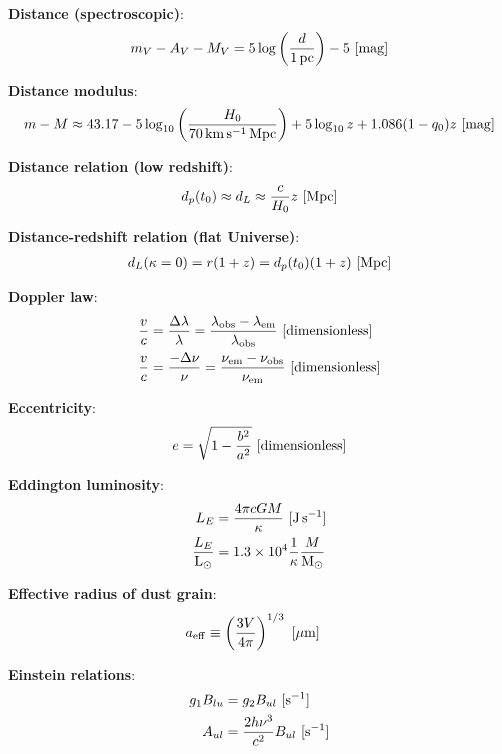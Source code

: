 \documentclass[a4paper,10pt]{article}
\begin{document}
{\noindent}\textbf{Distance (spectroscopic)}:
\begin{align*}
    m_V-A_V-M_V = 5\log\left(\frac{d}{1\,{\rm pc}}\right)-5 ~ [{\rm mag}]
\end{align*}

{\noindent}\textbf{Distance modulus}:
\begin{align*}
    m - M \approx 43.17 - 5\log_{10} \left(\frac{H_0}{70\,{\rm km\,s^{-1}\,Mpc}}\right) + 5\log_{10}z + 1.086(1-q_0)z ~ [{\rm mag}]
\end{align*}

{\noindent}\textbf{Distance relation (low redshift)}:
\begin{align*}
    d_p(t_0) \approx d_L \approx \frac{c}{H_0}z ~ [{\rm Mpc}]
\end{align*}

{\noindent}\textbf{Distance-redshift relation (flat Universe)}:
\begin{align*}
    d_L(\kappa=0) = r(1+z) = d_p(t_0)(1+z) ~ [{\rm Mpc}]
\end{align*}

{\noindent}\textbf{Doppler law}:
\begin{align*}
    \frac{v}{c} &= \frac{\Delta\lambda}{\lambda} =  \frac{\lambda_\mathrm{obs}-\lambda_\mathrm{em}}{\lambda_\mathrm{obs}} ~ [{\rm dimensionless}] \\
    \frac{v}{c} &= \frac{-\Delta\nu}{\nu} =  \frac{\nu_\mathrm{em}-\nu_\mathrm{obs}}{\nu_\mathrm{em}} ~ [{\rm dimensionless}]
\end{align*}

{\noindent}\textbf{Eccentricity}:
\begin{align*}
    e = \sqrt{1-\frac{b^2}{a^2}} ~ [{\rm dimensionless}]
\end{align*}

{\noindent}\textbf{Eddington luminosity}:
\begin{align*}
    L_E &= \frac{4\pi cGM}{\kappa} ~ [{\rm J\,s^{-1}}] \\
    \frac{L_E}{{\rm L_\odot}} &= 1.3\times10^4\frac{1}{\kappa} \frac{M}{{\rm M_\odot}}
\end{align*}

{\noindent}\textbf{Effective radius of dust grain}:
\begin{align*}
    a_{\rm eff} &\equiv \left(\frac{3V}{4\pi}\right)^{1/3}  ~ [{\rm \mu m}]
\end{align*}

{\noindent}\textbf{Einstein relations}:
\begin{align*}
    g_1B_{lu} &= g_2B_{ul} ~ [{\rm s^{-1}}] \\
    A_{ul}    &= \frac{2h\nu^3}{c^2}B_{ul}  ~ [{\rm s^{-1}}]
\end{align*}
\end{document}
